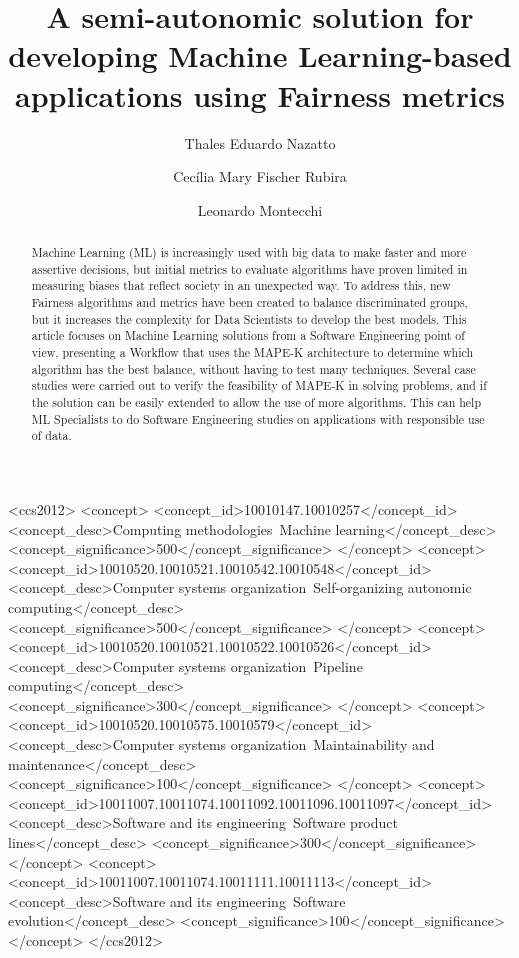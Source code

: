 \documentclass[sigconf]{acmart}
\title{A semi-autonomic solution for developing Machine Learning-based applications using Fairness metrics}
\author{Thales Eduardo Nazatto}
\affiliation{%
  \institution{University of Campinas}
  \streetaddress{P.O. Box 1212}
  \city{Campinas}
  \state{São Paulo}
  \country{Brazil}
  \postcode{43017-6221}
}
\author{Cecília Mary Fischer Rubira}
\affiliation{%
  \institution{University of Campinas}
  \streetaddress{P.O. Box 1212}
  \city{Campinas}
  \state{São Paulo}
  \country{Brazil}
  \postcode{43017-6221}
}
\author{Leonardo Montecchi}
\affiliation{%
  \institution{Norwegian University of Science and Technology}
  \city{Trondheim}
  \state{Trøndelag}
  \country{Norway}
}
\begin{document}

\begin{abstract}
Machine Learning (ML) is increasingly used with big data to make faster and more assertive decisions, but initial metrics to evaluate algorithms have proven limited in measuring biases that reflect society in an unexpected way. To address this, new Fairness algorithms and metrics have been created to balance discriminated groups, but it increases the complexity for Data Scientists to develop the best models. This article focuses on Machine Learning solutions from a Software Engineering point of view, presenting a Workflow that uses the MAPE-K architecture to determine which algorithm has the best balance, without having to test many techniques. Several case studies were carried out to verify the feasibility of MAPE-K in solving problems, and if the solution can be easily extended to allow the use of more algorithms. This can help ML Specialists to do Software Engineering studies on applications with responsible use of data.
\end{abstract}

\begin{CCSXML}
<ccs2012>
<concept>
<concept_id>10010147.10010257</concept_id>
<concept_desc>Computing methodologies~Machine learning</concept_desc>
<concept_significance>500</concept_significance>
</concept>
<concept>
<concept_id>10010520.10010521.10010542.10010548</concept_id>
<concept_desc>Computer systems organization~Self-organizing autonomic computing</concept_desc>
<concept_significance>500</concept_significance>
</concept>
<concept>
<concept_id>10010520.10010521.10010522.10010526</concept_id>
<concept_desc>Computer systems organization~Pipeline computing</concept_desc>
<concept_significance>300</concept_significance>
</concept>
<concept>
<concept_id>10010520.10010575.10010579</concept_id>
<concept_desc>Computer systems organization~Maintainability and maintenance</concept_desc>
<concept_significance>100</concept_significance>
</concept>
<concept>
<concept_id>10011007.10011074.10011092.10011096.10011097</concept_id>
<concept_desc>Software and its engineering~Software product lines</concept_desc>
<concept_significance>300</concept_significance>
</concept>
<concept>
<concept_id>10011007.10011074.10011111.10011113</concept_id>
<concept_desc>Software and its engineering~Software evolution</concept_desc>
<concept_significance>100</concept_significance>
</concept>
</ccs2012>
\end{CCSXML}
\end{document}
